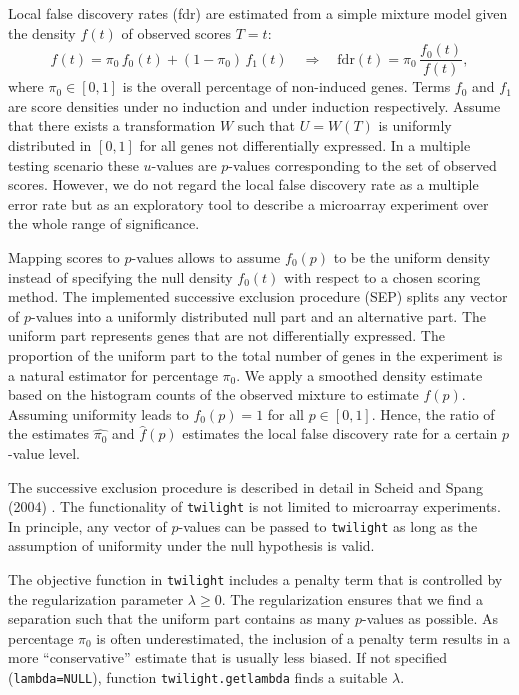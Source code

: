 \documentclass[11pt,a4paper,fleqn]{report}
\newcommand{\Rfunction}[1]{{\texttt{#1}}}
\newcommand{\Rfunarg}[1]{{\texttt{#1}}}
\begin{document}
Local false discovery rates (fdr) are estimated from a simple mixture model given the density $f(t)$ of observed scores $T=t$:
\begin{equation}
f(t) = \pi_0 \, f_0(t) + (1-\pi_0) \, f_1(t) \quad \Rightarrow \quad \mbox{fdr}(t)=\pi_0 \, \frac{f_0(t)}{f(t)},
\end{equation}
where $\pi_0 \in [0,1]$ is the overall percentage of non-induced genes. Terms $f_0$ and $f_1$ are score densities under no induction and under induction respectively. Assume that there exists a transformation $W$ such that $U=W(T)$ is uniformly distributed in $[0,1]$ for all genes not differentially expressed. In a multiple testing scenario these $u$-values are $p$-values corresponding to the set of observed scores. However, we do not regard the local false discovery rate as a multiple error rate but as an exploratory tool to describe a microarray experiment over the whole range of significance.

Mapping scores to $p$-values allows to assume $f_0(p)$ to be the uniform density instead of specifying the null density $f_0(t)$ with respect to a chosen scoring method. The implemented successive exclusion procedure (SEP) splits any vector of $p$-values into a uniformly distributed null part and an alternative part. The uniform part represents genes that are not differentially expressed. The proportion of the uniform part to the total number of genes in the experiment is a natural estimator for percentage $\pi_0$. We apply a smoothed density estimate based on the histogram counts of the observed mixture to estimate $f(p)$. Assuming uniformity leads to $f_0(p)=1$ for all $p \in [0,1]$. Hence, the ratio of the estimates $\widehat{\pi_0}$ and $\hat f(p)$ estimates the local false discovery rate for a certain $p$-value level.
       
The successive exclusion procedure is described in detail in Scheid and Spang (2004) \cite{scheid04}. The functionality of \Rfunction{twilight} is not limited to microarray experiments. In principle, any vector of $p$-values can be passed to \Rfunction{twilight} as long as the assumption of uniformity under the null hypothesis is valid.

The objective function in \Rfunction{twilight} includes a penalty term that is controlled by the regularization parameter $\lambda \geq 0$. The regularization ensures that we find a separation such that the uniform part contains as many $p$-values as possible. As percentage $\pi_0$ is often underestimated, the inclusion of a penalty term results in a more ``conservative'' estimate that is usually less biased. If not specified (\Rfunarg{lambda=NULL}), function \Rfunction{twilight.getlambda} finds a suitable $\lambda$.
\end{document}
